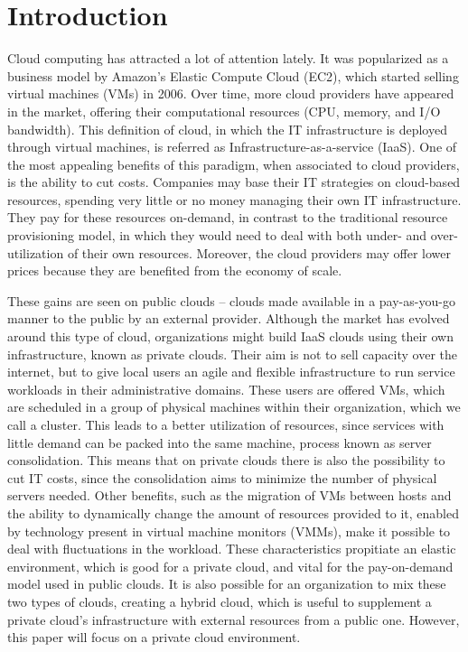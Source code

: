\chapter{\textbf{Introduction}}

\label{Introduction}

Cloud computing has attracted a lot of attention lately. It was popularized as a business model by Amazon's Elastic Compute Cloud (EC2), which started selling virtual machines (VMs) in 2006. Over time, more cloud providers have appeared in the market, offering their computational resources (CPU, memory, and I/O bandwidth). This definition of cloud, in which the IT infrastructure is deployed through virtual machines, is referred as Infrastructure-as-a-service (IaaS). One of the most appealing benefits of this paradigm, when associated to cloud providers, is the ability to cut costs. Companies may base their IT strategies on cloud-based resources, spending very little or no money managing their own IT infrastructure. They pay for these resources on-demand, in contrast to the traditional resource provisioning model, in which they would need to deal with both under- and over- utilization of their own resources. Moreover, the cloud providers may offer lower prices because they are benefited from the economy of 
scale.


These gains are seen on public clouds -- clouds made available in a pay-as-you-go manner to the public by an external provider. Although the market has evolved around this type of cloud, organizations might build IaaS clouds using their own infrastructure, known as private clouds. Their aim is not to sell capacity  over the internet,  but to give local users an agile and flexible infrastructure to run service workloads in their administrative domains. These users are offered VMs, which are scheduled in a group of physical machines within their organization, which we call a cluster. This leads to a better utilization of resources, since services with little demand can be packed into the same machine, process known as server consolidation. This means that on private clouds there is also the possibility to cut IT costs, since the consolidation aims to minimize the number of physical servers needed. Other benefits, such as the migration of VMs between hosts and the ability to dynamically change the 
amount of resources provided to it, enabled by technology present in virtual machine monitors (VMMs), make it 
possible to deal with fluctuations in the workload. These characteristics propitiate an elastic environment, which is good for a private cloud, and vital for the pay-on-demand model used in public clouds.  It is also possible for an organization to mix these two types of clouds, creating a hybrid cloud,  which is useful to supplement a private cloud's infrastructure with external resources from a public one. However, this paper will focus on a private cloud environment. 

